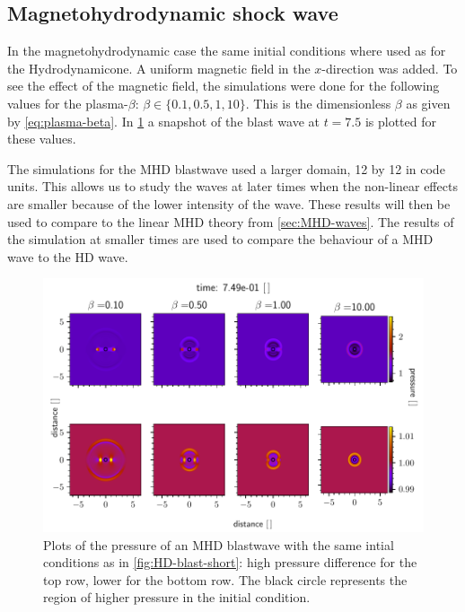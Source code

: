 \subsection{Magnetohydrodynamic shock wave}
In the magnetohydrodynamic case the same initial conditions where used as for the Hydrodynamicone.
A uniform magnetic field in the $x$-direction was added. 
To see the effect of the magnetic field, the simulations were done for the following values for the plasma-$\beta$: $\beta \in \{0.1, 0.5,1,10\}$.
This is the dimensionless $\beta$ as given by \cref{eq:plasma-beta}.
In \cref{fig:MHD-blasts} a snapshot of the blast wave at $t=7.5$ is plotted for these values.

The simulations for the MHD blastwave used a larger domain, 12 by 12 in code units.
This allows us to study the waves at later times when the non-linear effects are smaller because of the lower intensity of the wave.
These results will then be used to compare to the linear MHD theory from \cref{sec:MHD-waves}.
The results of the simulation at smaller times are used to compare the behaviour of a MHD wave to the HD wave.

\begin{figure}[H]
	\centering
	\includegraphics[width=\linewidth]{images/MHD-blasts.pdf}
	\caption{Plots of the pressure of an MHD blastwave with the same intial conditions as in \cref{fig:HD-blast-short}: high pressure difference for the top row, lower for the bottom row.
	The black circle represents the region of higher pressure in the initial condition.}
	\label{fig:MHD-blasts}
\end{figure}

